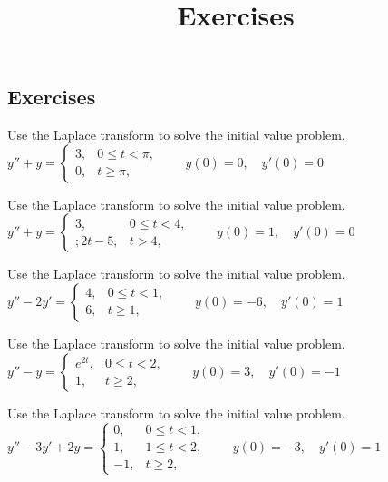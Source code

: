 \documentclass{ximera}
\title{Exercises} \license{CC BY-NC-SA 4.0}
\begin{document}
\begin{abstract}
\end{abstract}
\maketitle

\begin{onlineOnly}
\section*{Exercises}
\end{onlineOnly}

\begin{problem}\label{exer:8.5.1} 
Use the Laplace transform to solve the initial value problem.
$y''+y = \left\{\begin{array}{cl} 3,& 0\le t<\pi,\\ 0,&t\ge\pi,\end{array}\right.\qquad y(0)=0, \quad  y'(0)=0$
\end{problem}

\begin{problem}\label{exer:8.5.2} 
Use the Laplace transform to solve the initial value problem.
$y''+y=\left\{\begin{array}{cl} 3,&0\le
t<4,\\; 2t-5,&t > 4,\end{array}\right.\qquad y(0)=1,\quad y'(0)=0$
\end{problem}

\begin{problem}\label{exer:8.5.3} Use the Laplace transform to solve the initial value problem.
$y''-2y'= \left\{\begin{array}{cl} 4,&0\le
t<1,\\ 6,&t\ge 1,\end{array}\right.\qquad y(0)=-6,\quad y'(0)=1$
\end{problem}

\begin{problem}\label{exer:8.5.4} Use the Laplace transform to solve the initial value problem.
$y''-y=\left\{\begin{array}{cl} e^{2t},&0\le
t< 2,\\ 1,&t\ge 2,\end{array}\right.\qquad y(0)=3,\quad y'(0)=-1$
\end{problem}

\begin{problem}\label{exer:8.5.5} Use the Laplace transform to solve the initial value problem.
$y''-3y'+2y= \left\{\begin{array}{rl} 0,&0\le
t<1,\\ 1,&1\le t<2,\\ -1,&t\ge 2,\end{array}\right.\qquad y(0)=-3,\quad y'(0)=1$
\end{problem}
\end{document}
